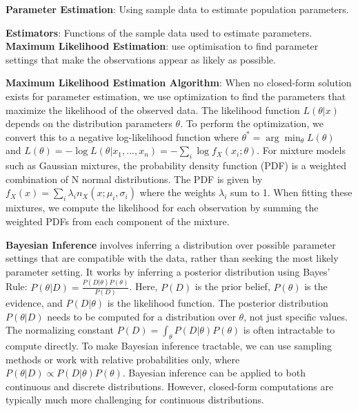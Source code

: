 \documentclass{article}
\begin{document}
\textbf{Parameter Estimation}: Using sample data to estimate population parameters.


\textbf{Estimators}: Functions of the sample data used to estimate parameters.
\textbf{Maximum Likelihood Estimation}: use optimisation to find parameter settings that make the observations appear as likely as possible.


\textbf{Maximum Likelihood Estimation Algorithm}:
When no closed-form solution exists for parameter estimation, we use optimization to find the parameters that maximize the likelihood of the observed data.
The likelihood function $L(\theta|x)$ depends on the distribution parameters $\theta$.
To perform the optimization, we convert this to a negative log-likelihood function where $\theta^* = \arg \min_\theta L(\theta)$ and $L(\theta) = -\log L(\theta|x_1,...,x_n) = -\sum_i \log f_X(x_i;\theta)$.
For mixture models such as Gaussian mixtures, the probability density function (PDF) is a weighted combination of N normal distributions.
The PDF is given by $f_X(x) = \sum_i \lambda_i n_X(x;\mu_i,\sigma_i)$ where the weights $\lambda_i$ sum to 1.
When fitting these mixtures, we compute the likelihood for each observation by summing the weighted PDFs from each component of the mixture.



\textbf{Bayesian Inference} involves inferring a distribution over possible parameter settings that are compatible with the data, rather than seeking the most likely parameter setting.
It works by inferring a posterior distribution using Bayes' Rule: $P(\theta|D) = \frac{P(D|\theta)P(\theta)}{P(D)}$.
Here, $P(D)$ is the prior belief, $P(\theta)$ is the evidence, and $P(D|\theta)$ is the likelihood function.
The posterior distribution $P(\theta|D)$ needs to be computed for a distribution over $\theta$, not just specific values.
The normalizing constant $P(D) = \int_\theta P(D|\theta)P(\theta)$ is often intractable to compute directly.
To make Bayesian inference tractable, we can use sampling methods or work with relative probabilities only, where $P(\theta|D) \propto P(D|\theta)P(\theta)$.
Bayesian inference can be applied to both continuous and discrete distributions.
However, closed-form computations are typically much more challenging for continuous distributions.

\end{document}
